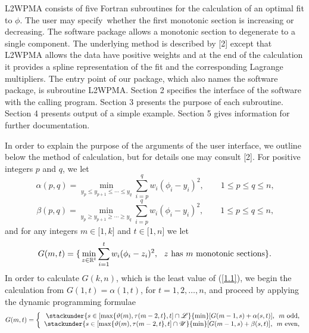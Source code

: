 \documentclass[acmtoms]{acmtrans2m}
\begin{document}
L2WPMA consists of five Fortran subroutines for the calculation of an
optimal fit to $\phi $. The user may specify\ whether the first monotonic
section is increasing or decreasing. The software package allows a monotonic
section to degenerate to a single component. The underlying method is
described by [2] except that L2WPMA allows the data have positive weights
and at the end of the calculation it provides a spline representation of the
fit and the corresponding Lagrange multipliers. The entry point of our
package, which also names the software package, is subroutine L2WPMA.
Section 2 specifies the interface of the software with the calling program.
Section 3 presents the purpose of each subroutine. Section 4 presents output
of a simple example. Section 5 gives information for further documentation.

In order to explain the purpose of the arguments of the user interface, we
outline below the method of calculation, but for details one may consult
[2]. For positive integers $p$ and $q$, we let 
\begin{equation}
\alpha (p,q)=\mathop {\min }\limits_{y_{p}\leq y_{p+1}\leq \cdots \leq
y_{q}}\sum\limits_{i=p}^{q}{w_{i}}(\phi _{i}-y_{i})^{2},\qquad 1\leq p\leq
q\leq n\text{,}  \label{1.4}
\end{equation}
\begin{equation}
\beta (p,q)=\mathop {\min }\limits_{y_{p}\geq y_{p+1}\geq \cdots \geq
y_{q}}\sum\limits_{i=p}^{q}{w_{i}}(\phi _{i}-y_{i})^{2},\qquad 1\leq p\leq
q\leq n\text{,}  \label{1.5}
\end{equation}
and for any integers $m\in \lbrack 1,k]$ and $t\in \lbrack 1,n]$ we let 
\[
G(m,t)=\text{\{}\mathop {\min }\limits_{z\in \Bbb{R}^{t}}\sum%
\limits_{i=1}^{t}{w_{i}}(\phi _{i}-z_{i})^{2},\text{ \ }z\text{ has }m\text{
monotonic sections\}.} 
\]
\newline
In order to calculate $G(k,n)$, which is the least value of (\ref{1.1}), we
begin the calculation from $G(1,t)=\alpha (1,t)$, for $t=1,2,\ldots ,n$, and
proceed by applying the dynamic programming formulae 
\begin{equation}
G(m,t)=\left\{ 
\begin{array}{r}
\stackunder{s\in \lbrack \max \{\vartheta (m),\tau (m-2,t\},t]\cap %
\mathscr{L}}{\min }[G(m-1,s)+\alpha (s,t)]\text{, \ }m\text{ odd,} \\ 
\stackunder{s\in \lbrack \max \{\vartheta (m),\tau (m-2,t\},t]\cap %
\mathscr{U}}{\min }[G(m-1,s)+\beta (s,t)]\text{, \ }m\text{ even,}
\end{array}
\right.  \label{1.6}
\end{equation}
\end{document}
